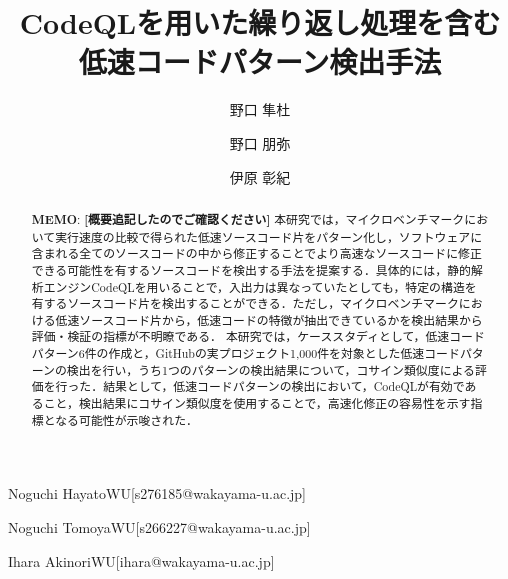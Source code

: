 \documentclass[submit,techrep,noauthor]{ipsj}
\newcommand{\todo}[1]{\colorbox{yellow}{{\bf TODO}:}{\color{red} {\textbf{[#1]}}}}
\newcommand{\memo}[1]{\colorbox{magenta!30}{{\bf MEMO}:}{\color{red!50} {\textbf{[#1]}}}}
\begin{document}
\title{CodeQLを用いた繰り返し処理を含む
\\
低速コードパターン検出手法
}


\author{野口 隼杜}{Noguchi Hayato}{WU}[s276185@wakayama-u.ac.jp]
\author{野口 朋弥}{Noguchi Tomoya}{WU}[s266227@wakayama-u.ac.jp]
\author{伊原 彰紀}{Ihara Akinori}{WU}[ihara@wakayama-u.ac.jp]

\begin{abstract}
\memo{概要追記したのでご確認ください}
本研究では，マイクロベンチマークにおいて実行速度の比較で得られた低速ソースコード片をパターン化し，ソフトウェアに含まれる全てのソースコードの中から修正することでより高速なソースコードに修正できる可能性を有するソースコードを検出する手法を提案する．具体的には，静的解析エンジンCodeQLを用いることで，入出力は異なっていたとしても，特定の構造を有するソースコード片を検出することができる．ただし，マイクロベンチマークにおける低速ソースコード片から，低速コードの特徴が抽出できているかを検出結果から評価・検証の指標が不明瞭である．
本研究では，ケーススタディとして，低速コードパターン6件の作成と，GitHubの実プロジェクト1,000件を対象とした低速コードパターンの検出を行い，うち1つのパターンの検出結果について，コサイン類似度による評価を行った．結果として，低速コードパターンの検出において，CodeQLが有効であること，検出結果にコサイン類似度を使用することで，高速化修正の容易性を示す指標となる可能性が示唆された．

\end{abstract}
\end{document}

